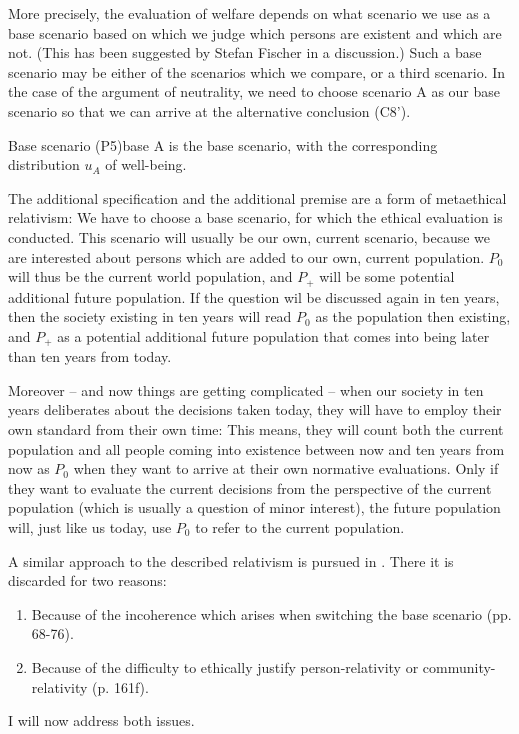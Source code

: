 More precisely, the evaluation of welfare depends on what scenario we use as a base scenario based on which we judge which persons are existent and which are not. (This has been suggested by Stefan Fischer in a discussion.) Such a base scenario may be either of the scenarios which we compare, or a third scenario. In the case of the argument of neutrality, we need to choose scenario A as our base scenario so that we can arrive at the alternative conclusion (C8’). 

\begin{Premise}{Base scenario (P5)}{base}
A is the base scenario, with the corresponding distribution $u_A$ of well-being.
\end{Premise}

The additional specification and the additional premise are a form of metaethical relativism: We have to choose a base scenario, for which the ethical evaluation is conducted. This scenario will usually be our own, current scenario, because we are interested about persons which are added to our own, current population. $P_0$ will thus be the current world population, and $P_+$ will be some potential additional future population. If the question wil be discussed again in ten years, then the society existing in ten years will read $P_0$ as the population then existing, and $P_+$ as a potential additional future population that comes into being later than ten years from today. 

Moreover -- and now things are getting complicated -- when our society in ten years deliberates about the decisions taken today, they will have to employ their own standard from their own time: This means, they will count both the current population and all people coming into existence between now and ten years from now as $P_0$ when they want to arrive at their own normative evaluations. Only if they want to evaluate the current decisions from the perspective of the current population (which is usually a question of minor interest), the future population will, just like us today, use $P_0$ to refer to the current population. 

A similar approach to the described relativism is pursued in . There it is discarded for two reasons:
\begin{enumerate}
\item Because of the incoherence which arises when switching the base scenario (pp. 68-76). 
\item Because of the difficulty to ethically justify person-relativity or com\-mu\-ni\-ty-relativity (p. 161f). 
\end{enumerate}
I will now address both issues.  

